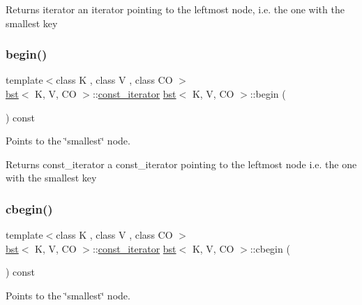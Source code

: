 \begin{DoxyReturn}{Returns}
iterator an iterator pointing to the leftmost node, i.\+e. the one with the smallest key 
\end{DoxyReturn}
\mbox{\label{classbst_a6eaec5eeced2766a4dfbe194f60308c4}} 
\subsubsection{\texorpdfstring{begin()}{begin()}\hspace{0.1cm}{\footnotesize\ttfamily [2/2]}}
{\footnotesize\ttfamily template$<$class K , class V , class CO $>$ \\
\hyperlink{classbst}{bst}$<$ K, V, CO $>$\+::\hyperlink{classbst_1_1__iterator}{const\+\_\+iterator} \hyperlink{classbst}{bst}$<$ K, V, CO $>$\+::begin (\begin{DoxyParamCaption}{ }\end{DoxyParamCaption}) const\hspace{0.3cm}{\ttfamily [noexcept]}}



Points to the \char`\"{}smallest\char`\"{} node. 

\begin{DoxyReturn}{Returns}
const\+\_\+iterator a const\+\_\+iterator pointing to the leftmost node i.\+e. the one with the smallest key 
\end{DoxyReturn}
\mbox{\label{classbst_a79997e0ce6b5e09285541ac17d5d079e}} 
\subsubsection{\texorpdfstring{cbegin()}{cbegin()}}
{\footnotesize\ttfamily template$<$class K , class V , class CO $>$ \\
\hyperlink{classbst}{bst}$<$ K, V, CO $>$\+::\hyperlink{classbst_1_1__iterator}{const\+\_\+iterator} \hyperlink{classbst}{bst}$<$ K, V, CO $>$\+::cbegin (\begin{DoxyParamCaption}{ }\end{DoxyParamCaption}) const\hspace{0.3cm}{\ttfamily [noexcept]}}



Points to the \char`\"{}smallest\char`\"{} node. 

